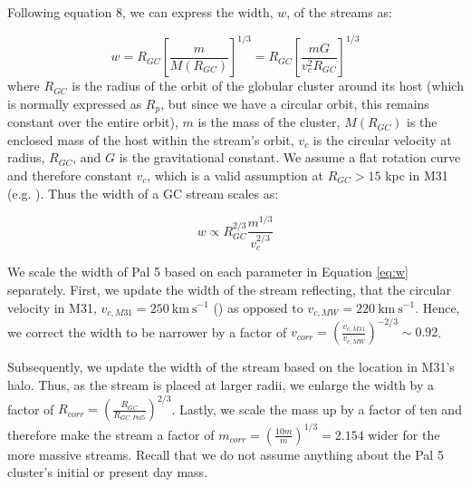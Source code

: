 \documentclass[twocolumn]{aastex62}
\newcommand{\kms}{\ensuremath{\textrm{km}~\textrm{s}^{-1}}}
\begin{document}
Following \citet{johnston01} equation 8, we can express the width, $w$, of the streams as:

\begin{equation}
w = R_{GC} \left[\frac{m}{M(R_{GC})}\right]^{1/3} = R_{GC} \left[\frac{m G}{v_c^2 R_{GC}}\right]^{1/3} 
\end{equation}
where $R_{GC}$ is the radius of the orbit of the globular cluster around its host (which is normally expressed as $R_p$, but since we have a circular orbit, this remains constant over the entire orbit), $m$ is the mass of the cluster, $M(R_{GC})$ is the enclosed mass of the host within the stream's orbit, $v_c$ is the circular velocity at radius, $R_{GC}$, and $G$ is the gravitational constant. We assume a flat rotation curve and therefore constant  $v_c$, which is a valid assumption at $R_{GC} > 15$ kpc in M31 (e.g. \citealt{chemin09}). Thus the width of a GC stream scales as:

\begin{equation}
\label{eq:w}
w \propto R_{GC}^{2/3} \frac{m^{1/3}}{v_c^{2/3}}
\end{equation}

We scale the width of Pal 5 based on each parameter in Equation \ref{eq:w} separately. First, we update the width of the stream reflecting, that the circular velocity in M31, $v_{c, M31}= 250 ~\kms$  (\citealt{chemin09}) as opposed to  $v_{c, MW}= 220 ~\kms$. Hence, we correct the width to be narrower by a factor of $v_{corr} =  \left(\frac{v_{c,M31}}{v_{c,MW}}\right)^{-2/3} \sim 0.92$. 

Subsequently, we update the width of the stream based on the location in M31's halo. Thus, as the stream is placed at larger radii, we enlarge the width by a factor of  $R_{corr} = \left(\frac{R_{GC}}{R_{GC,Pal5}}\right)^{2/3}$. Lastly, we scale the mass up by a factor of ten and therefore make the stream a factor of $m_{corr} = \left(\frac{10m}{m}\right)^{1/3}= 2.154$ wider for the more massive streams. Recall that we do not assume anything about the Pal 5 cluster's initial or present day mass. 
\end{document}
